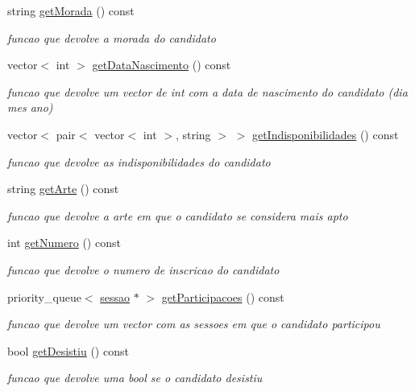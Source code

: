 \begin{DoxyCompactItemize}
string \hyperlink{classcandidato_ae62bf91f25150db0c78f69b966f4545a}{get\+Morada} () const 
\begin{DoxyCompactList}\small\item\em funcao que devolve a morada do candidato \end{DoxyCompactList}\item 
vector$<$ int $>$ \hyperlink{classcandidato_a0f5795cf0f0d5fc7844ffff30476a9aa}{get\+Data\+Nascimento} () const 
\begin{DoxyCompactList}\small\item\em funcao que devolve um vector de int com a data de nascimento do candidato (dia mes ano) \end{DoxyCompactList}\item 
vector$<$ pair$<$ vector$<$ int $>$, string $>$ $>$ \hyperlink{classcandidato_a0e4f09123b2158963634cf42695a8e6f}{get\+Indisponibilidades} () const 
\begin{DoxyCompactList}\small\item\em funcao que devolve as indisponibilidades do candidato \end{DoxyCompactList}\item 
string \hyperlink{classcandidato_ad111af25051e3eefd77f81c528423fc0}{get\+Arte} () const 
\begin{DoxyCompactList}\small\item\em funcao que devolve a arte em que o candidato se considera mais apto \end{DoxyCompactList}\item 
int \hyperlink{classcandidato_ab2d533767a7b78d4c4f0c29fb5aad3ab}{get\+Numero} () const 
\begin{DoxyCompactList}\small\item\em funcao que devolve o numero de inscricao do candidato \end{DoxyCompactList}\item 
priority\+\_\+queue$<$ \hyperlink{classsessao}{sessao} $\ast$ $>$ \hyperlink{classcandidato_acc36e35588dc83bb81ab67721c851d08}{get\+Participacoes} () const 
\begin{DoxyCompactList}\small\item\em funcao que devolve um vector com as sessoes em que o candidato participou \end{DoxyCompactList}\item 
bool \hyperlink{classcandidato_a348b126294752dd6ae5efab72fd15265}{get\+Desistiu} () const 
\begin{DoxyCompactList}\small\item\em funcao que devolve uma bool se o candidato desistiu \end{DoxyCompactList}\item 

\end{DoxyCompactItemize}
